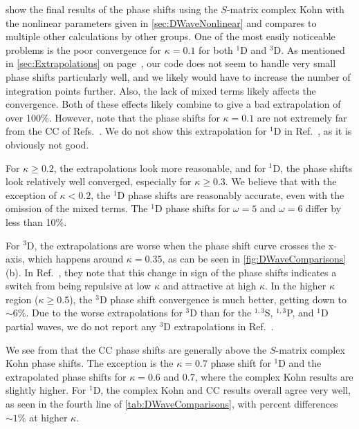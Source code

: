 \documentclass[Dissertation.tex]{subfiles}
\begin{document}
 show the final results of 
the phase shifts using the $S$-matrix complex Kohn with the nonlinear 
parameters given in \cref{sec:DWaveNonlinear} and compares to multiple other 
calculations by other groups. One of the most easily noticeable problems is
the poor convergence for $\kappa = 0.1$ for both $^1$D and $^3$D. As mentioned
in \cref{sec:Extrapolations} on page~\pageref{sec:Extrapolations}, our code
does not seem to handle very small phase shifts particularly well, and we
likely would have to increase the number of integration points further. Also, the 
lack of mixed terms likely affects the convergence. Both of these effects
likely combine to give a bad extrapolation of over 100\%. However, note that
the phase shifts for $\kappa = 0.1$ are not extremely far from the CC of
Refs.~\cite{Walters2004,Blackwood2002}. We do not show this extrapolation for
$^1$D in Ref.~\cite{Woods2015}, as it is obviously not good.

For $\kappa \geq 0.2$, the extrapolations look more reasonable, and for $^1$D,
the phase shifts look relatively well converged, especially for $\kappa \geq 0.3$.
We believe that with the exception of $\kappa < 0.2$, the $^1$D phase shifts are
reasonably accurate, even with the omission of the mixed terms. The $^1$D phase
shifts for $\omega = 5$ and $\omega = 6$ differ by less than 10\%.

For $^3$D, the extrapolations are worse when the phase shift curve crosses the
x-axis, which happens around $\kappa = 0.35$, as can be seen in
\cref{fig:DWaveComparisons}(b). In Ref.~\cite{Blackwood2002}, they note \label{DWaveSwitch} that
this change in sign of the phase shifts indicates a switch from being repulsive
at low $\kappa$ and attractive at high $\kappa$. In the higher
$\kappa$ region ($\kappa \geq 0.5$),
the $^3$D phase shift convergence is much better, getting down to $\sim\!6\%$.
Due to the worse extrapolations for $^3$D than for the $^{1,3}$S, $^{1,3}$P,
and $^1$D partial waves, we do not report any $^3$D extrapolations in
Ref.~\cite{Woods2015}.

We see from  that the CC phase shifts
\cite{Blackwood2002,Walters2004} are generally above the $S$-matrix complex Kohn phase shifts. The exception is the
$\kappa = 0.7$ phase shift for $^1$D and the extrapolated phase shifts for
$\kappa = 0.6$ and $0.7$, where the complex Kohn results are slightly higher.
For $^1$D, the complex Kohn and CC \cite{Walters2004} results overall agree
very well, as seen in the fourth line of \cref{tab:DWaveComparisons}, with
percent differences $\sim\!1\%$ at higher $\kappa$.
\end{document}
